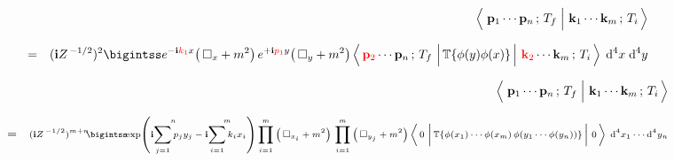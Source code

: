 
\begin{lemma}
\begin{eqnarray*}
&&
    \underset{{\color{white}1}}{
        \left\langle\,
            \left.
            \overset{{\color{white}1}}{\mathbf{p}_{1}} \cdots \mathbf{p}_{n}\,;\,T_{f}
            \;\right\vert\,
            \mathbf{k}_{1} \cdots \mathbf{k}_{m}\,;\,T_{i}
            \,\right\rangle
        }
\\
& = &
    (\i Z^{\,-1/2})^{2}
    \bigintss
        e^{-\i {\color{red}k_{1}}x}\!\left(\,\square_{x}+m^{2}\right)
        e^{+\i {\color{red}p_{1}}y}\!\left(\,\square_{y}+m^{2}\right)
        \left\langle\,
            {\color{red}\mathbf{p}_{2}} \cdots \mathbf{p}_{n}\,;\,T_{f}
            \,\left\vert\,
            \overset{{\color{white}.}}{\mathbb{T}\!\left\{\phi(y)\phi(x)\right\}}
            \,\right\vert\,
            {\color{red}\mathbf{k}_{2}} \cdots \mathbf{k}_{m}\,;\,T_{i}
            \,\right\rangle
            \;\d^{4}x\;\d^{4}y
\end{eqnarray*}
\end{lemma}


\begin{corollary}
\begin{eqnarray*}
&&
    \underset{{\color{white}1}}{
        \left\langle\,
            \left.
            \overset{{\color{white}1}}{\mathbf{p}_{1}} \cdots \mathbf{p}_{n}\,;\,T_{f}
            \;\right\vert\,
            \mathbf{k}_{1} \cdots \mathbf{k}_{m}\,;\,T_{i}
            \,\right\rangle
        }
\\
& = &
    \textnormal{\scriptsize$
    (\i Z^{\,-1/2})^{m+n}\!\!
    \bigintss\!\!
        \exp\!\left(
            \i\overset{n}{\underset{j=1}{\sum}\,p_{j}y_{j}}
            -
            \i\overset{m}{\underset{i=1}{\sum}\,k_{i}x_{i}}
            \right)
        \overset{m}{\underset{i=1}{\prod}}\left(\,\square_{x_{i}}+m^{2}\right)\,
        \overset{m}{\underset{i=1}{\prod}}\left(\,\square_{y_{j}}+m^{2}\right)
        \left\langle\,
            0
            \,\left\vert\,
            \overset{{\color{white}.}}{\mathbb{T}\!\left\{
                \phi(x_{1})\cdots\phi(x_{m})\,\phi(y_{1}\cdots\phi(y_{n}))
                \right\}}
            \,\right\vert\,
            0
            \,\right\rangle
            \;\d^{4}x_{1}\cdots\d^{4}y_{n}
    $}
\end{eqnarray*}
\end{corollary}

